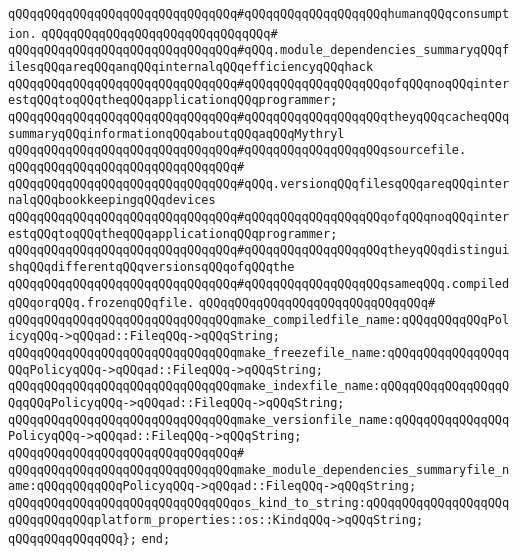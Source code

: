 \verb|qQQqqQQqqQQqqQQqqQQqqQQqqQQqqQQq#qQQqqQQqqQQqqQQqqQQqhumanqQQqconsumption.|\newline
\verb|qQQqqQQqqQQqqQQqqQQqqQQqqQQqqQQq#|\newline
\verb|qQQqqQQqqQQqqQQqqQQqqQQqqQQqqQQq#qQQq.module_dependencies_summaryqQQqfilesqQQqareqQQqanqQQqinternalqQQqefficiencyqQQqhack|\newline
\verb|qQQqqQQqqQQqqQQqqQQqqQQqqQQqqQQq#qQQqqQQqqQQqqQQqqQQqofqQQqnoqQQqinterestqQQqtoqQQqtheqQQqapplicationqQQqprogrammer;|\newline
\verb|qQQqqQQqqQQqqQQqqQQqqQQqqQQqqQQq#qQQqqQQqqQQqqQQqqQQqtheyqQQqcacheqQQqsummaryqQQqinformationqQQqaboutqQQqaqQQqMythryl|\newline
\verb|qQQqqQQqqQQqqQQqqQQqqQQqqQQqqQQq#qQQqqQQqqQQqqQQqqQQqsourcefile.|\newline
\verb|qQQqqQQqqQQqqQQqqQQqqQQqqQQqqQQq#|\newline
\verb|qQQqqQQqqQQqqQQqqQQqqQQqqQQqqQQq#qQQq.versionqQQqfilesqQQqareqQQqinternalqQQqbookkeepingqQQqdevices|\newline
\verb|qQQqqQQqqQQqqQQqqQQqqQQqqQQqqQQq#qQQqqQQqqQQqqQQqqQQqofqQQqnoqQQqinterestqQQqtoqQQqtheqQQqapplicationqQQqprogrammer;|\newline
\verb|qQQqqQQqqQQqqQQqqQQqqQQqqQQqqQQq#qQQqqQQqqQQqqQQqqQQqtheyqQQqdistinguishqQQqdifferentqQQqversionsqQQqofqQQqthe|\newline
\verb|qQQqqQQqqQQqqQQqqQQqqQQqqQQqqQQq#qQQqqQQqqQQqqQQqqQQqsameqQQq.compiledqQQqorqQQq.frozenqQQqfile.|\newline
\verb|qQQqqQQqqQQqqQQqqQQqqQQqqQQqqQQq#|\newline
\verb|qQQqqQQqqQQqqQQqqQQqqQQqqQQqqQQqmake_compiledfile_name:qQQqqQQqqQQqPolicyqQQq->qQQqad::FileqQQq->qQQqString;|\newline
\verb|qQQqqQQqqQQqqQQqqQQqqQQqqQQqqQQqmake_freezefile_name:qQQqqQQqqQQqqQQqqQQqPolicyqQQq->qQQqad::FileqQQq->qQQqString;|\newline
\verb|qQQqqQQqqQQqqQQqqQQqqQQqqQQqqQQqmake_indexfile_name:qQQqqQQqqQQqqQQqqQQqqQQqPolicyqQQq->qQQqad::FileqQQq->qQQqString;|\newline
\verb|qQQqqQQqqQQqqQQqqQQqqQQqqQQqqQQqmake_versionfile_name:qQQqqQQqqQQqqQQqPolicyqQQq->qQQqad::FileqQQq->qQQqString;|\newline
\verb|qQQqqQQqqQQqqQQqqQQqqQQqqQQqqQQq#|\newline
\verb|qQQqqQQqqQQqqQQqqQQqqQQqqQQqqQQqmake_module_dependencies_summaryfile_name:qQQqqQQqqQQqPolicyqQQq->qQQqad::FileqQQq->qQQqString;|\newline
\newline
\verb|qQQqqQQqqQQqqQQqqQQqqQQqqQQqqQQqos_kind_to_string:qQQqqQQqqQQqqQQqqQQqqQQqqQQqqQQqplatform_properties::os::KindqQQq->qQQqString;|\newline
\newline
\verb|qQQqqQQqqQQqqQQq};|\newline
\verb|end;|\newline
\newline


